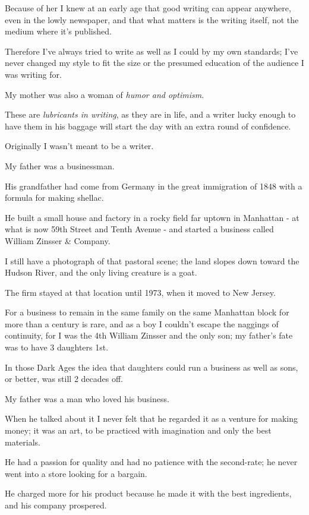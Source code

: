 \documentclass{book}
\numberwithin{equation}{section}
\begin{document}
Because of her I knew at an early age that good writing can appear anywhere, even in the lowly newspaper, and that what matters is the writing itself, not the medium where it's published.

Therefore I've always tried to write as well as I could by my own standards; I've never changed my style to fit the size or the presumed education of the audience I was writing for.

My mother was also a woman of \textit{humor and optimism}.

These are \textit{lubricants in writing}, as they are in life, and a writer lucky enough to have them in his baggage will start the day with an extra round of confidence.

%
Originally I wasn't meant to be a writer.

My father was a businessman.

His grandfather had come from Germany in the great immigration of 1848 with a formula for making shellac.

He built a small house and factory in a rocky field far uptown in Manhattan - at what is now 59th Street and Tenth Avenue - and started a business called William Zinsser \& Company.

I still have a photograph of that pastoral scene; the land slopes down toward the Hudson River, and the only living creature is a goat.

The firm stayed at that location until 1973, when it moved to New Jersey.

For a business to remain in the same family on the same Manhattan block for more than a century is rare, and as a boy I couldn't escape the naggings of continuity, for I was the 4th William Zinsser and the only son; my father's fate was to have 3 daughters 1st.

In those Dark Ages the idea that daughters could run a business as well as sons, or better, was still 2 decades off.

My father was a man who loved his business.

When he talked about it I never felt that he regarded it as a venture for making money; it was an art, to be practiced with imagination and only the best materials.

He had a passion for quality and had no patience with the second-rate; he never went into a store looking for a bargain.

He charged more for his product because he made it with the best ingredients, and his company prospered.
\end{document}
